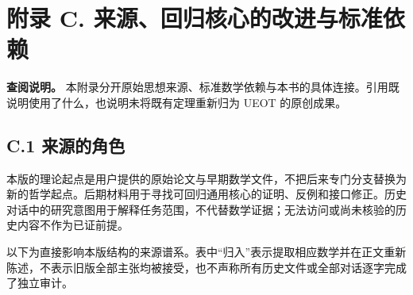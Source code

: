 \documentclass[
  11pt,
  oneside]{book}
\begin{document}
\chapter{附录 C. 来源、回归核心的改进与标准依赖}\label{appendix-c}

\textbf{查阅说明。} 本附录分开原始思想来源、标准数学依赖与本书的具体连接。引用既说明使用了什么，也说明未将既有定理重新归为 UEOT 的原创成果。

\section{C.1 来源的角色}\label{c.1-ux6765ux6e90ux7684ux89d2ux8272}

本版的理论起点是用户提供的原始论文与早期数学文件，不把后来专门分支替换为新的哲学起点。后期材料用于寻找可回归通用核心的证明、反例和接口修正。历史对话中的研究意图用于解释任务范围，不代替数学证据；无法访问或尚未核验的历史内容不作为已证前提。

以下为直接影响本版结构的来源谱系。表中``归入''表示提取相应数学并在正文重新陈述，不表示旧版全部主张均被接受，也不声称所有历史文件或全部对话逐字完成了独立审计。
\end{document}
